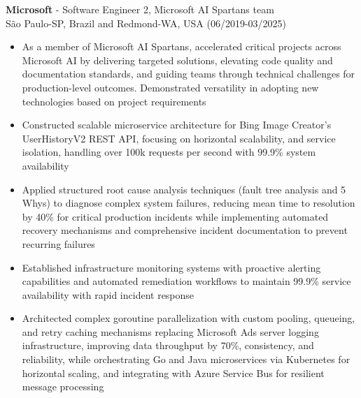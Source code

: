 
\normalsize{\textbf{Microsoft} - Software Engineer 2, Microsoft AI Spartans team}\\
\footnotesize{São Paulo-SP, Brazil and Redmond-WA, USA (06/2019-03/2025)}

\begin{itemize}
    \item \small{As a member of Microsoft AI Spartans, accelerated critical projects across Microsoft AI by delivering targeted solutions, elevating code quality and documentation standards, and guiding teams through technical challenges for production-level outcomes. Demonstrated versatility in adopting new technologies based on project requirements}

    \item \small{Constructed scalable microservice architecture for Bing Image Creator's UserHistoryV2 REST API, focusing on horizontal scalability, and service isolation, handling over 100k requests per second with 99.9\% system availability}

    \item \small{Applied structured root cause analysis techniques (fault tree analysis and 5 Whys) to diagnose complex \BackEnd{} system failures, reducing mean time to resolution by 40\% for critical production incidents while implementing automated recovery mechanisms and comprehensive incident documentation to prevent recurring failures}

    \item \small{Established infrastructure monitoring systems with proactive alerting capabilities and automated remediation workflows to maintain 99.9\% service availability with rapid incident response}

    \item \small{Architected complex goroutine parallelization with custom pooling, queueing, and retry caching mechanisms replacing Microsoft Ads server logging infrastructure, improving data throughput by 70\%, consistency, and reliability, while orchestrating Go and Java microservices via Kubernetes for horizontal scaling, and integrating with Azure Service Bus for resilient message processing}


\end{itemize}
